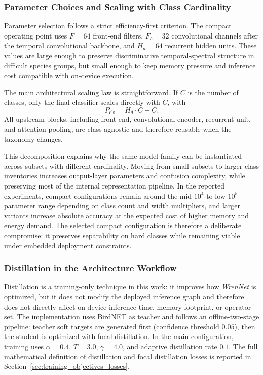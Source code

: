 \documentclass[a4paper,singleside,12pt]{report} %
\begin{document}
	\subsubsection{Parameter Choices and Scaling with Class Cardinality}
	Parameter selection follows a strict efficiency-first criterion. The compact operating point uses \(F=64\) front-end filters, \(F_c=32\) convolutional channels after the temporal convolutional backbone, and \(H_d=64\) recurrent hidden units. These values are large enough to preserve discriminative temporal-spectral structure in difficult species groups, but small enough to keep memory pressure and inference cost compatible with on-device execution.

	The main architectural scaling law is straightforward. If \(C\) is the number of classes, only the final classifier scales directly with \(C\), with
	\begin{equation}
		P_{\mathrm{cls}} = H_d \cdot C + C.
	\end{equation}
	All upstream blocks, including front-end, convolutional encoder, recurrent unit, and attention pooling, are class-agnostic and therefore reusable when the taxonomy changes.

	This decomposition explains why the same model family can be instantiated across subsets with different cardinality. Moving from small subsets to larger class inventories increases output-layer parameters and confusion complexity, while preserving most of the internal representation pipeline. In the reported experiments, compact configurations remain around the mid-\(10^4\) to low-\(10^5\) parameter range depending on class count and width multipliers, and larger variants increase absolute accuracy at the expected cost of higher memory and energy demand. The selected compact configuration is therefore a deliberate compromise: it preserves separability on hard classes while remaining viable under embedded deployment constraints.

	\subsubsection{Distillation in the Architecture Workflow}
	\label{sec:distillation_workflow}
	Distillation is a training-only technique in this work: it improves how \emph{WrenNet} is optimized, but it does not modify the deployed inference graph and therefore does not directly affect on-device inference time, memory footprint, or operator set. The implementation uses BirdNET as teacher and follows an offline-two-stage pipeline: teacher soft targets are generated first (confidence threshold \(0.05\)), then the student is optimized with focal distillation. In the main configuration, training uses \(\alpha=0.4\), \(T=3.0\), \(\gamma=4.0\), and adaptive distillation rate \(0.1\). The full mathematical definition of distillation and focal distillation losses is reported in Section~\ref{sec:training_objectives_losses}.
\end{document}
